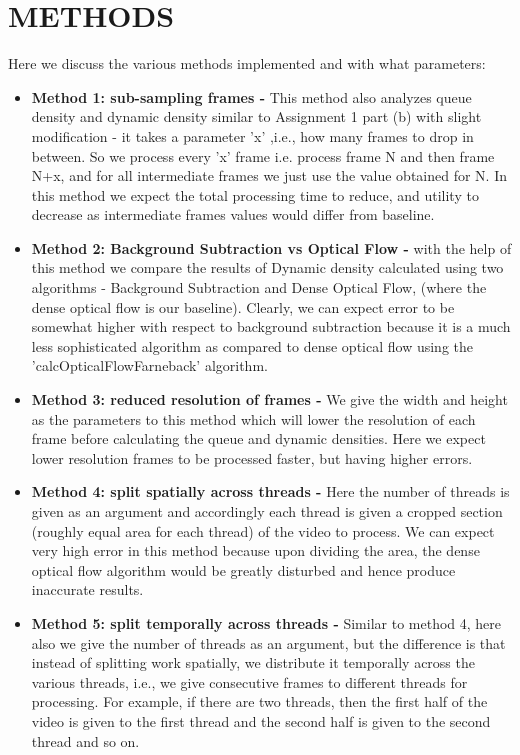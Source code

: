 \documentclass[paper=a4, fontsize = 12pt]{scrartcl}
\numberwithin{equation}{section}		%
\numberwithin{figure}{section}			%
\numberwithin{table}{section}				%
\begin{document}
\section{METHODS}
Here we discuss the various methods implemented and with what parameters:
\begin{itemize}
    \item \textbf{Method 1: sub-sampling frames -} This method also analyzes queue density and dynamic density similar to Assignment 1 part (b) with slight modification - it takes a parameter 'x' ,i.e., how many frames to drop in between. So we process every 'x' frame i.e. process frame N and then frame N+x, and for all intermediate frames we just use the value obtained for N. In this method we expect the total processing time to reduce, and utility to decrease as intermediate frames values would differ from baseline.
    
    \item \textbf{Method 2: Background Subtraction vs Optical Flow -} with the help of this method we compare the results of Dynamic density calculated using two algorithms - Background Subtraction and Dense Optical Flow, (where the dense optical flow is our baseline). Clearly, we can expect error to be somewhat higher with respect to background subtraction because it is a much less sophisticated algorithm as compared to dense optical flow using the 'calcOpticalFlowFarneback' algorithm.
    
    \item \textbf{Method 3: reduced resolution of frames -} We give the width and height as the parameters to this method which will lower the resolution of each frame before calculating the queue and dynamic densities. Here we expect lower resolution frames to be processed faster, but having higher errors.
    
    \item \textbf{Method 4: split spatially across threads -} Here the number of threads is given as an argument and accordingly each thread is given a cropped section (roughly equal area for each thread) of the video to process. We can expect very high error in this method because upon dividing the area, the dense optical flow algorithm would be greatly disturbed and hence produce inaccurate results.
    
    \item \textbf{Method 5: split temporally across threads -} Similar to method 4, here also we give the number of threads as an argument, but the difference is that instead of splitting work spatially, we distribute it temporally across the various threads, i.e., we give consecutive frames to different threads for processing. For example, if there are two threads, then the first half of the video is given to the first thread and the second half is given to the second thread and so on.

\end{itemize}
\end{document}
